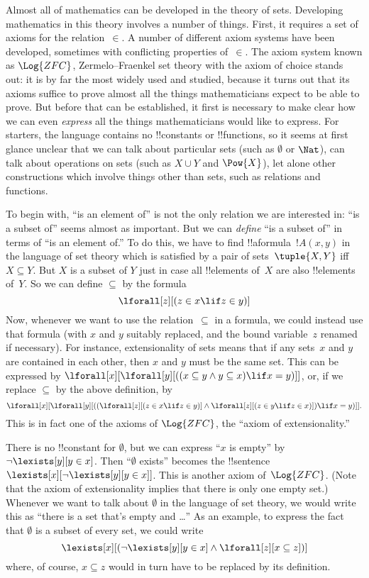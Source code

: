 \documentclass[../../../include/open-logic-section]{subfiles}
\begin{document}

Almost all of mathematics can be developed in the theory of sets.
Developing mathematics in this theory involves a number of things.
First, it requires a set of axioms for the relation~$\in$.  A number
of different axiom systems have been developed, sometimes with
conflicting properties of~$\in$.  The axiom system known as
$\Log{ZFC}$, Zermelo--Fraenkel set theory with the axiom of choice
stands out: it is by far the most widely used and studied, because it
turns out that its axioms suffice to prove almost all the things
mathematicians expect to be able to prove.  But before that can be
established, it first is necessary to make clear how we can even
\emph{express} all the things mathematicians would like to express.
For starters, the language contains no !!{constant}s or !!{function}s,
so it seems at first glance unclear that we can talk about particular
sets (such as $\emptyset$ or $\Nat$), can talk about operations on
sets (such as $X \cup Y$ and $\Pow{X}$), let alone other
constructions which involve things other than sets, such as relations
and functions.

To begin with, ``is an element of'' is not the only relation we are
interested in: ``is a subset of'' seems almost as important.  But we
can \emph{define} ``is a subset of'' in terms of ``is an element of.''
To do this, we have to find !!a{formula}~$!A(x, y)$ in
the language of set theory which is satisfied by a pair of
sets~$\tuple{X, Y}$ iff $X \subseteq Y$.  But $X$ is a subset of $Y$
just in case all !!{element}s of~$X$ are also !!{element}s of~$Y$.  So
we can define $\subseteq$ by the formula
\[
\lforall[z][(z \in x \lif z \in y)]
\]
Now, whenever we want to use the relation~$\subseteq$ in a formula, we
could instead use that formula (with $x$ and $y$ suitably replaced,
and the bound variable~$z$ renamed if necessary).  For instance,
extensionality of sets means that if any sets~$x$ and $y$ are
contained in each other, then $x$ and $y$ must be the same set. This
can be expressed by $\lforall[x][\lforall[y][((x \subseteq y \land y
    \subseteq x) \lif x = y)]]$, or, if we replace $\subseteq$ by the
above definition, by
\[
\lforall[x][\lforall[y][((\lforall[z][(z \in x \lif z \in y)] \land
    \lforall[z][(z \in y \lif z \in x)]) \lif x = y)]].
\]
This is in fact one of the axioms of $\Log{ZFC}$, the ``axiom of
extensionality.''

There is no !!{constant} for $\emptyset$, but we can express ``$x$ is
empty'' by $\lnot \lexists[y][y \in x]$.  Then ``$\emptyset$ exists''
becomes the !!{sentence}~$\lexists[x][\lnot \lexists[y][y \in
    x]]$. This is another axiom of~$\Log{ZFC}$.  (Note that the axiom
of extensionality implies that there is only one empty set.)  Whenever
we want to talk about $\emptyset$ in the language of set theory, we
would write this as ``there is a set that's empty and \dots'' As an
example, to express the fact that $\emptyset$ is a subset of every
set, we could write
\[
\lexists[x][(\lnot\lexists[y][y \in x] \land \lforall[z][x \subseteq
    z])]
\]
where, of course, $x \subseteq z$ would in turn have to be replaced by
its definition.
\end{document}
